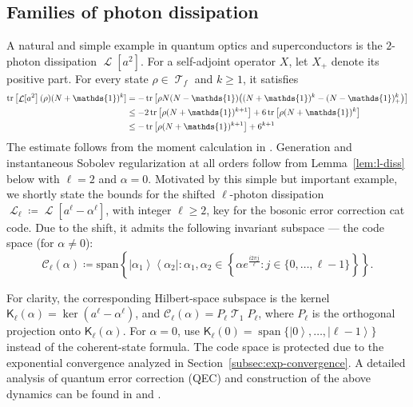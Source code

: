 \documentclass[11pt]{article}
\theoremstyle{myplain}
\theoremstyle{mydefinition}
\theoremstyle{remark}
\DeclareMathOperator{\cL}{\mathcal{L}}
\DeclareMathOperator{\cT}{\mathcal{T}}
\DeclareMathOperator{\1}{\mathds{1}}
\newcommand{\ket}[1]{\left\vert #1 \right\rangle}
\newcommand{\bra}[1]{\left\langle #1 \right\vert}
\newcommand{\tr}[1][]{\operatorname{tr}%
  \ifx#1\empty \else \left[ #1 \right] \fi}
\begin{document}
    \subsection{Families of photon dissipation}\label{subsec:single-mode-application}
        A natural and simple example in quantum optics and superconductors is the $2$-photon dissipation $\cL[a^2]$. For a self-adjoint operator $X$, let $X_+$ denote its positive part. For every state $\rho\in\cT_f$ and $k\geq1$, it satisfies
        \begin{equation*}
            \begin{aligned}
                \tr[\cL[a^2](\rho)(N+\1)^k]&=-\tr[\rho N(N-\1)\bigl((N+\1)^k-(N-\1)_+^k\bigr)]\\
                &\leq-2\tr[\rho(N+\1)^{k+1}]+6\tr[\rho(N+\1)^{k}]\\
                &\leq-\tr[\rho(N+\1)^{k+1}]+6^{k+1}
            \end{aligned}
        \end{equation*}
        The estimate follows from the moment calculation in \cite[Lem.~4.3]{Gondolf.2024}. Generation and instantaneous Sobolev regularization at all orders follow from Lemma~\ref{lem:l-diss} below with $\ell=2$ and $\alpha=0$. Motivated by this simple but important example, we shortly state the bounds for the shifted $\ell$-photon dissipation $\cL_\ell\coloneqq\cL[a^\ell-\alpha^\ell]$, with integer $\ell \geq 2$, key for the bosonic error correction cat code. Due to the shift, it admits the following invariant subspace --- the code space (for $\alpha\neq0$):
        \begin{equation}\label{eq:codespace-ell-photon-diss}
            \mathcal{C}_\ell(\alpha) \coloneqq \mathrm{span}\left\{\ket{\alpha_1}\bra{\alpha_2} : \alpha_1, \alpha_2 \in \left\{\alpha e^{\frac{i2\pi j}{\ell}} : j \in \{0, \ldots, \ell-1\}\right\}\right\}.
        \end{equation}

        
        For clarity, the corresponding Hilbert-space subspace is the kernel $\mathsf K_\ell(\alpha)=\ker(a^\ell-\alpha^\ell)$, and $\mathcal C_\ell(\alpha)=P_\ell\cT_1P_\ell$, where $P_\ell$ is the orthogonal projection onto $\mathsf K_\ell(\alpha)$. For $\alpha=0$, use $\mathsf K_\ell(0)=\operatorname{span}\{\ket0,\ldots,\ket{\ell-1}\}$ instead of the coherent-state formula. The code space is protected due to the exponential convergence analyzed in Section~\ref{subsec:exp-convergence}. A detailed analysis of quantum error correction (QEC) and construction of the above dynamics can be found in \cite[Secs.~2.1 and 3]{Guillaud.2023} and \cite{Azouit.2016, Gondolf.2024}.
\end{document}
